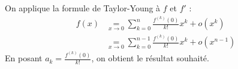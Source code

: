\documentclass[../main.tex]{subfiles}
\begin{document}
\noindent On applique la formule de Taylor-Young à $f$ et $f'$ : 
\begin{align*}
    f(x) &\underset{x\to 0}{=} \sum_{k=0}^{n} \frac{f^{(k)}(0)}{k!} x^k + o(x^k) \\
    &\underset{x\to 0}{=} \sum_{k=0}^{n-1} \frac{f^{(k)}(0)}{k!} x^k + o(x^{n-1})
\end{align*}
En posant $a_k = \frac{f^{(k)}(0)}{k!}$, on obtient le résultat souhaité. 
\end{document}

